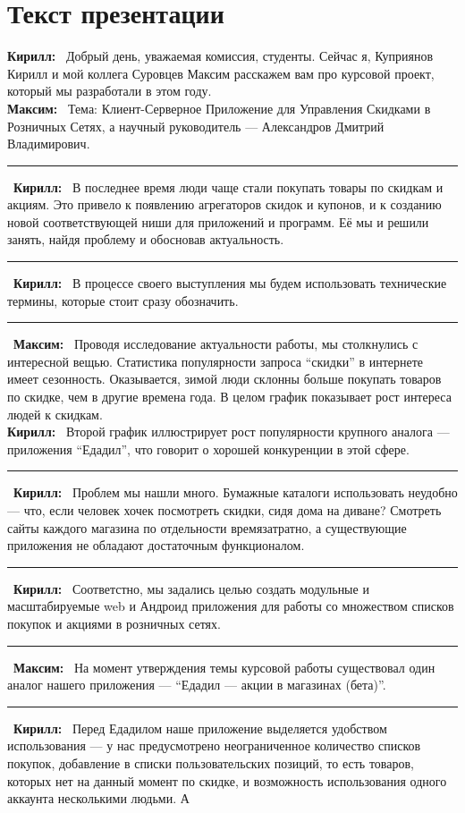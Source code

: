 \documentclass[12pt]{article}
\newcommand{\kir}{\textbf{Кирилл: }}
\renewcommand{\max}{\textbf{Максим: }}
\renewcommand{\line}{\noindent\rule{\textwidth}{1pt}}
\begin{document}
\section*{Текст презентации}

\kir\ Добрый день, уважаемая комиссия, студенты. Сейчас я, Куприянов Кирилл и мой
коллега Суровцев Максим расскажем вам про курсовой проект, который мы
разработали в этом году.\\
\max\ Тема: Клиент-Серверное Приложение для Управления Скидками в Розничных
Сетях, а научный руководитель --- Александров Дмитрий Владимирович.\\
\line\
\kir\ В последнее время люди чаще стали покупать товары по скидкам и акциям. Это
привело к появлению агрегаторов скидок и купонов, и к созданию новой
соответствующей ниши для приложений и программ. Её мы и решили занять, найдя
проблему и обосновав актуальность.\\
\line\
\kir\ В процессе своего выступления мы будем использовать технические термины,
которые стоит сразу обозначить.\\
\line\
\max\ Проводя исследование актуальности работы, мы столкнулись с интересной вещью.
Статистика популярности запроса ``скидки'' в интернете имеет сезонность.
Оказывается, зимой люди склонны больше покупать товаров по скидке, чем в другие
времена года. В целом график показывает рост интереса людей к скидкам.\\
\kir\ Второй график иллюстрирует рост популярности крупного аналога ---
приложения ``Едадил'', что говорит о хорошей конкуренции в этой сфере.\\
\line\
\kir\ Проблем мы нашли много. Бумажные каталоги использовать неудобно --- что,
если человек хочек посмотреть скидки, сидя дома на диване? Смотреть сайты
каждого магазина по отдельности времязатратно, а существующие приложения не
обладают достаточным функционалом.\\
\line\
\kir\ Соответстно, мы задались целью создать модульные и масштабируемые web и
Андроид приложения для работы со множеством списков покупок и акциями в
розничных сетях.
\line\
\max\ На момент утверждения темы курсовой работы существовал один аналог нашего
приложения --- ``Едадил --- акции в магазинах (бета)''.\\
\line\
\kir\ Перед Едадилом наше приложение выделяется удобством использования --- у
нас предусмотрено неограниченное количество списков покупок, добавление в
списки пользовательских позиций, то есть товаров, которых нет на данный момент
по скидке, и возможность использования одного аккаунта несколькими людьми.  А
\end{document}

